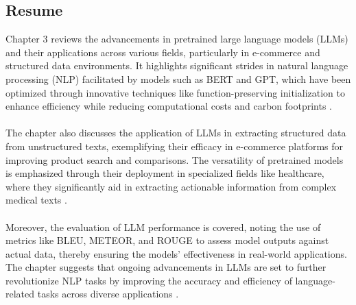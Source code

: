 \subsection{Resume}
Chapter 3 reviews the advancements in pretrained large language models (LLMs) and their applications across various fields, particularly in e-commerce and structured data environments. It highlights significant strides in natural language processing (NLP) facilitated by models such as BERT and GPT, which have been optimized through innovative techniques like function-preserving initialization to enhance efficiency while reducing computational costs and carbon footprints .
\\\\
The chapter also discusses the application of LLMs in extracting structured data from unstructured texts, exemplifying their efficacy in e-commerce platforms for improving product search and comparisons. The versatility of pretrained models is emphasized through their deployment in specialized fields like healthcare, where they significantly aid in extracting actionable information from complex medical texts .
\\\\
Moreover, the evaluation of LLM performance is covered, noting the use of metrics like BLEU, METEOR, and ROUGE to assess model outputs against actual data, thereby ensuring the models' effectiveness in real-world applications. The chapter suggests that ongoing advancements in LLMs are set to further revolutionize NLP tasks by improving the accuracy and efficiency of language-related tasks across diverse applications .